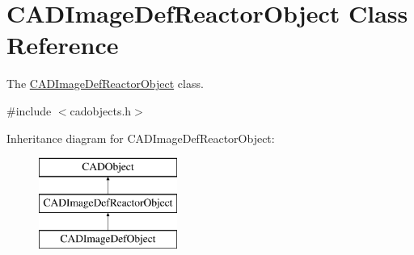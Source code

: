 \hypertarget{class_c_a_d_image_def_reactor_object}{}\section{C\+A\+D\+Image\+Def\+Reactor\+Object Class Reference}
\label{class_c_a_d_image_def_reactor_object}


The \hyperlink{class_c_a_d_image_def_reactor_object}{C\+A\+D\+Image\+Def\+Reactor\+Object} class.  




{\ttfamily \#include $<$cadobjects.\+h$>$}

Inheritance diagram for C\+A\+D\+Image\+Def\+Reactor\+Object\+:\begin{figure}[H]
\begin{center}
\leavevmode
\includegraphics[height=3.000000cm]{class_c_a_d_image_def_reactor_object}
\end{center}
\end{figure}
